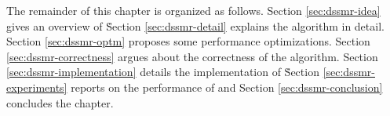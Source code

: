 The remainder of this chapter is organized as follows.
Section \ref{sec:dssmr-idea} gives an overview of \dssmr\.
Section \ref{sec:dssmr-detail} explains the algorithm in detail.
Section \ref{sec:dssmr-optm} proposes some performance optimizations.
Section \ref{sec:dssmr-correctness} argues about the correctness of the algorithm.
Section \ref{sec:dssmr-implementation} details the implementation of \dssmrlibname\.
Section \ref{sec:dssmr-experiments} reports on the performance of \dssmrlibname and \dssmrappname
Section \ref{sec:dssmr-conclusion} concludes the chapter.
